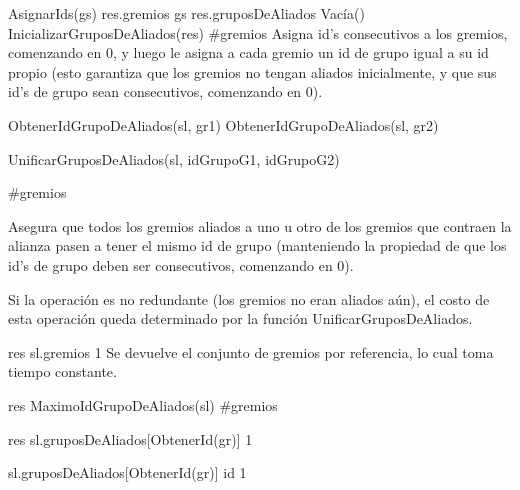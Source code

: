 {
	\state AsignarIds(gs)								
	\state res.gremios \asig gs 						
	\state
	\state res.gruposDeAliados \asig Vacía()			
	\state InicializarGruposDeAliados(res)				
}
{\#gremios}
{Asigna id's consecutivos a los gremios, comenzando en 0, y luego le asigna a cada gremio un id de grupo igual a su id propio (esto garantiza que los gremios no tengan aliados inicialmente, y que sus id's de grupo sean consecutivos, comenzando en 0). }

{
	\state {} \asig ObtenerIdGrupoDeAliados(sl, gr1)			
	\state {} \asig ObtenerIdGrupoDeAliados(sl, gr2)			
	\state 

													
		\state UnificarGruposDeAliados(sl, idGrupoG1, idGrupoG2)					
	\endif
}
{\#gremios}
{ Asegura que todos los gremios aliados a uno u otro de los gremios que contraen la alianza pasen a tener el mismo id de grupo (manteniendo la propiedad de que los id's de grupo deben ser consecutivos, comenzando en 0).

\hspace{10pt} Si la operación es no redundante (los gremios no eran aliados aún), el costo de esta operación queda determinado por la función UnificarGruposDeAliados. }

{
	\state res \asig sl.gremios								
}
{1}
{ Se devuelve el conjunto de gremios por referencia, lo cual toma tiempo constante. }

{
	\state res \asig MaximoIdGrupoDeAliados(sl)			
}
{\#gremios}
{}

{
	\state res \asig sl.gruposDeAliados[ObtenerId(gr)]			
}
{1}
{}

{
	\state sl.gruposDeAliados[ObtenerId(gr)] \asig id			
}
{1}
{}

